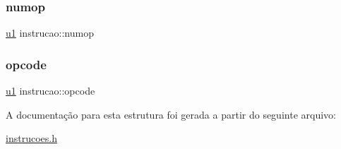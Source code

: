 \mbox{\label{structinstrucao_ae1e28e385eb8ef40eba3918cd8f458d0}} 
\subsubsection{\texorpdfstring{numop}{numop}}
{\footnotesize\ttfamily \hyperlink{lista__operandos_8h_ad9f4cdb6757615aae2fad89dab3c5470}{u1} instrucao\+::numop}

\mbox{\label{structinstrucao_a6fab1343e02c9298bc65ce60976e41a0}} 
\subsubsection{\texorpdfstring{opcode}{opcode}}
{\footnotesize\ttfamily \hyperlink{lista__operandos_8h_ad9f4cdb6757615aae2fad89dab3c5470}{u1} instrucao\+::opcode}



A documentação para esta estrutura foi gerada a partir do seguinte arquivo\+:\begin{DoxyCompactItemize}
\item 
\hyperlink{instrucoes_8h}{instrucoes.\+h}\end{DoxyCompactItemize}
